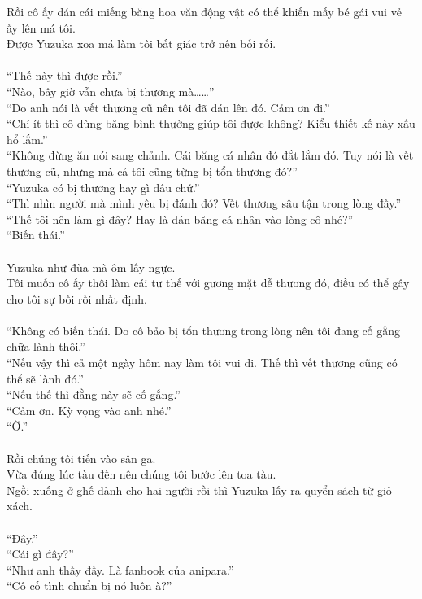 \documentclass[12pt,a4paper, twosides]{book}
\begin{document}
Rồi cô ấy dán cái miếng băng hoa văn động vật có thể khiến mấy bé gái vui vẻ ấy lên má tôi.\\
Được Yuzuka xoa má làm tôi bất giác trở nên bối rối.\\
\\
“Thế này thì được rồi.”\\
“Nào, bây giờ vẫn chưa bị thương mà……”\\
“Do anh nói là vết thương cũ nên tôi đã dán lên đó. Cảm ơn đi.”\\
“Chí ít thì cô dùng băng bình thường giúp tôi được không? Kiểu thiết kế này xấu hổ lắm.”\\
“Không đừng ăn nói sang chảnh. Cái băng cá nhân đó đắt lắm đó. Tuy nói là vết thương cũ, nhưng mà cả tôi cũng từng bị tổn thương đó?”\\
“Yuzuka có bị thương hay gì đâu chứ.”\\
“Thì nhìn người mà mình yêu bị đánh đó? Vết thương sâu tận trong lòng đấy.”\\
“Thế tôi nên làm gì đây? Hay là dán băng cá nhân vào lòng cô nhé?”\\
“Biến thái.”\\
\\
Yuzuka như đùa mà ôm lấy ngực.\\
Tôi muốn cô ấy thôi làm cái tư thế với gương mặt dễ thương đó, điều có thể gây cho tôi sự bối rối nhất định.\\
\\
“Không có biến thái. Do cô bảo bị tổn thương trong lòng nên tôi đang cố gắng chữa lành thôi.”\\
“Nếu vậy thì cả một ngày hôm nay làm tôi vui đi. Thế thì vết thương cũng có thể sẽ lành đó.”\\
“Nếu thế thì đằng này sẽ cố gắng.”\\
“Cảm ơn. Kỳ vọng vào anh nhé.”\\
“Ờ.”\\
\\
Rồi chúng tôi tiến vào sân ga.\\
Vừa đúng lúc tàu đến nên chúng tôi bước lên toa tàu.\\
Ngồi xuống ở ghế dành cho hai người rồi thì Yuzuka lấy ra quyển sách từ giỏ xách.\\
\\
“Đây.”\\
“Cái gì đây?”\\
“Như anh thấy đấy. Là fanbook của anipara.”\\
“Cô cố tình chuẩn bị nó luôn à?”\\
\end{document}
